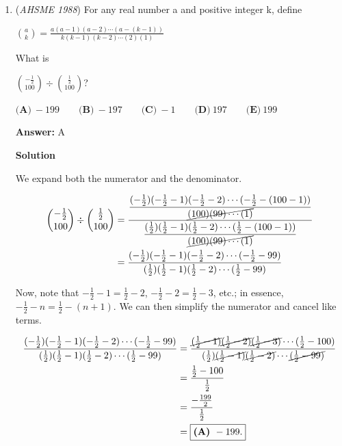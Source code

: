 \begin{enumerate}
 


	\item (\textit{AHSME 1988}) For any real number a and positive integer k, define


 ${a \choose k} = \frac{a(a-1)(a-2)\cdots(a-(k-1))}{k(k-1)(k-2)\cdots(2)(1)}$


 What is


 ${-\frac{1}{2} \choose 100} \div {\frac{1}{2} \choose 100}$?


 $\textbf{(A)}\ -199\qquad \textbf{(B)}\ -197\qquad \textbf{(C)}\ -1\qquad \textbf{(D)}\ 197\qquad \textbf{(E)}\ 199$

 \textbf{Answer: }A



\textbf{Solution}

We expand both the numerator and the denominator.

 
 \begin{align*} \binom{-\frac{1}{2}}{100}\div\binom{\frac{1}{2}}{100} &= \frac{   \dfrac{     (-\frac{1}{2})     (-\frac{1}{2} - 1)     (-\frac{1}{2} - 2)     \cdots     (-\frac{1}{2} - (100 - 1))   }{\cancel{(100)(99)\cdots(1)}} }{   \dfrac{     (\frac{1}{2})     (\frac{1}{2} - 1)     (\frac{1}{2} - 2)     \cdots     (\frac{1}{2} - (100 - 1))   }{\cancel{(100)(99)\cdots(1)}} } \\ &= \frac{     (-\frac{1}{2})     (-\frac{1}{2} - 1)     (-\frac{1}{2} - 2)     \cdots     (-\frac{1}{2} - 99) }{     (\frac{1}{2})     (\frac{1}{2} - 1)     (\frac{1}{2} - 2)     \cdots     (\frac{1}{2} - 99) } \end{align*}


 Now, note that $-\frac{1}{2}-1=\frac{1}{2}-2$, $-\frac{1}{2}-2=\frac{1}{2}-3$, etc.; in essence, $-\frac{1}{2}-n=\frac{1}{2}-(n+1)$. We can then simplify the numerator and cancel like terms.

 
 \begin{align*} \frac{     (-\frac{1}{2})     (-\frac{1}{2} - 1)     (-\frac{1}{2} - 2)     \cdots     (-\frac{1}{2} - 99) }{     (\frac{1}{2})     (\frac{1}{2} - 1)     (\frac{1}{2} - 2)     \cdots     (\frac{1}{2} - 99) } &= \frac{     \cancel{(\frac{1}{2} - 1)}     \cancel{(\frac{1}{2} - 2)}     \cancel{(\frac{1}{2} - 3)}     \cdots     (\frac{1}{2} - 100) }{     (\frac{1}{2})     \cancel{(\frac{1}{2} - 1)}     \cancel{(\frac{1}{2} - 2)}     \cdots     \cancel{(\frac{1}{2} - 99)} } \\ &= \frac{\frac{1}{2}-100}{\frac{1}{2}} \\ &= \frac{-\frac{199}{2}}{\frac{1}{2}} \\ &= \boxed{\textbf{(A) } -199.} \end{align*}





\end{enumerate}
